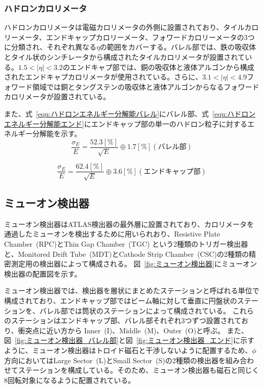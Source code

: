 \subsubsection{ハドロンカロリメータ}
ハドロンカロリメータは電磁カロリメータの外側に設置されており、タイルカロリーメータ、エンドキャップカロリーメータ、フォワードカロリーメータの3つに分類され、それぞれ異なる$\eta$の範囲をカバーする。バレル部では、鉄の吸収体とタイル状のシンチレータから構成されたタイルカロリメータが設置されている。$1.5 < |\eta| < 3.2$のエンドキャプ部では、銅の吸収体と液体アルゴンから構成されたエンドキャプカロリメータが使用されている。さらに、$3.1 < |\eta| < 4.9$フォワード領域では銅とタングステンの吸収体と液体アルゴンからなるフォワードカロリメータが設置されている。

また、式~\eqref{equ:ハドロンエネルギー分解能バレル}にバレル部、式~\eqref{equ:ハドロンエネルギー分解能エンド}にエンドキャップ部の単一のハドロン粒子に対するエネルギー分解能を示す。
\begin{equation}
    \frac{\sigma_{E}}{E} = \frac{52.3 [\%]}{\sqrt{E}}\oplus 1.7 [\%]　(バレル部)
　\label{equ:ハドロンエネルギー分解能バレル}
\end{equation}

\begin{equation}
    \frac{\sigma_{E}}{E} = \frac{62.4 [\%]}{\sqrt{E}}\oplus 3.6 [\%]　(エンドキャップ部)
　\label{equ:ハドロンエネルギー分解能エンド}
\end{equation}

\subsection{ミューオン検出器}\label{section2-2-4}
ミューオン検出器はATLAS検出器の最外層に設置されており、カロリメータを通過したミューオンを検出するために用いられおり、Resistive Plate Chamber~(RPC)とThin Gap Chamber~(TGC) という2種類のトリガー検出器と、Monitored Drift Tube~(MDT)とCathode Strip Chamber~(CSC)の2種類の精密測定用の検出器によって構成される。
図~\ref{fig:ミューオン検出器}にミューオン検出器の配置図を示す。

ミューオン検出器では、検出器を層状にまとめたステーションと呼ばれる単位で構成されており、エンドキャップ部ではビーム軸に対して垂直に円盤状のステーションを、バレル部では筒状のステーションによって構成されている。
これらのステーションはエンドキャップ部、バレル部それぞれ3つずつ設置されており、衝突点に近い方から Inner~(I)、Middle~(M)、Outer~(O)と呼ぶ。
また、図~\ref{fig:ミューオン検出器_バレル部}と図~\ref{fig:ミューオン検出器_エンド}に示すように、ミューオン検出器はトロイド磁石と干渉しないように配置するため、$\phi$方向においてはLarge Sector~(L)とSmall Sector~(S)の2種類の検出器を組み合わせてステーションを構成している。そのため、ミューオン検出器も磁石と同じく8回転対象になるように配置されている。


